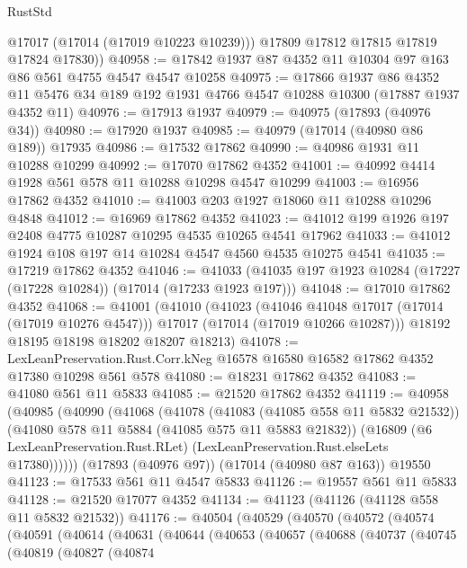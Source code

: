 \begin{lexlean}{RustStd}
\begin{coremodule}
          @17017
          (@17014 (@17019 @10223 @10239)))
        @17809
        @17812
        @17815
        @17819
        @17824
        @17830))
@40958 := @17842 @1937 @87 @4352 @11 @10304 @97 @163 @86 @561 @4755 @4547 @4547 @10258
@40975 := @17866
    @1937
    @86
    @4352
    @11
    @5476
    @34
    @189
    @192
    @1931
    @4766
    @4547
    @10288
    @10300
    (@17887 @1937 @4352 @11)
@40976 := @17913 @1937
@40979 := @40975 (@17893 (@40976 @34))
@40980 := @17920 @1937
@40985 := @40979 (@17014 (@40980 @86 @189)) @17935
@40986 := @17532 @17862
@40990 := @40986 @1931 @11 @10288 @10299
@40992 := @17070 @17862 @4352
@41001 := @40992 @4414 @1928 @561 @578 @11 @10288 @10298 @4547 @10299
@41003 := @16956 @17862 @4352
@41010 := @41003 @203 @1927 @18060 @11 @10288 @10296 @4848
@41012 := @16969 @17862 @4352
@41023 := @41012 @199 @1926 @197 @2408 @4775 @10287 @10295 @4535 @10265 @4541 @17962
@41033 := @41012 @1924 @108 @197 @14 @10284 @4547 @4560 @4535 @10275 @4541
@41035 := @17219 @17862 @4352
@41046 := @41033 (@41035 @197 @1923 @10284 (@17227 (@17228 @10284)) (@17014 (@17233 @1923 @197)))
@41048 := @17010 @17862 @4352
@41068 := @41001
    (@41010
      (@41023
        (@41046 @41048 @17017 (@17014 (@17019 @10276 @4547)))
        @17017
        (@17014 (@17019 @10266 @10287)))
      @18192
      @18195
      @18198
      @18202
      @18207
      @18213)
@41078 := LexLeanPreservation.Rust.Corr.kNeg
    @16578
    @16580
    @16582
    @17862
    @4352
    @17380
    @10298
    @561
    @578
@41080 := @18231 @17862 @4352
@41083 := @41080 @561 @11 @5833
@41085 := @21520 @17862 @4352
@41119 := @40958
    (@40985
      (@40990
        (@41068
          (@41078
            (@41083 (@41085 @558 @11 @5832 @21532))
            (@41080 @578 @11 @5884 (@41085 @575 @11 @5883 @21832))
            (@16809
              (@6 LexLeanPreservation.Rust.RLet)
              (LexLeanPreservation.Rust.elseLets @17380))))))
    (@17893 (@40976 @97))
    (@17014 (@40980 @87 @163))
    @19550
@41123 := @17533 @561 @11 @4547 @5833
@41126 := @19557 @561 @11 @5833
@41128 := @21520 @17077 @4352
@41134 := @41123 (@41126 (@41128 @558 @11 @5832 @21532))
@41176 := @40504
    (@40529
      (@40570
        (@40572
          (@40574
            (@40591
              (@40614
                (@40631
                  (@40644
                    (@40653
                      (@40657
                        (@40688
                          (@40737
                            (@40745
                              (@40819
                                (@40827
                                  (@40874

\end{coremodule}
\end{lexlean}
